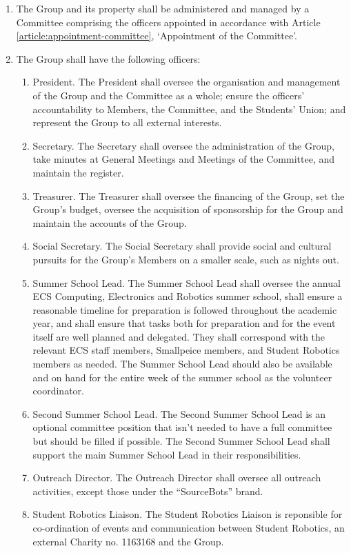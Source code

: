 \documentclass[12pt]{constitution}
\begin{document}
\begin{enumerate}
    \item The Group and its property shall be administered and managed by a Committee comprising the officers appointed in accordance with Article \ref{article:appointment-committee}, `Appointment of the Committee'.
    \item The Group shall have the following officers:
    \begin{enumerate}
        \item President. The President shall oversee the organisation and management of the Group and the Committee as a whole; ensure the officers' accountability to Members, the Committee, and the Students' Union; and represent the Group to all external interests.
        \item Secretary. The Secretary shall oversee the administration of the Group, take minutes at General Meetings and Meetings of the Committee, and maintain the register.
        \item Treasurer. The Treasurer shall oversee the financing of the Group, set the Group's budget, oversee the acquisition of sponsorship for the Group and maintain the accounts of the Group.
        \item Social Secretary. The Social Secretary shall provide social and cultural pursuits for the Group’s Members on a smaller scale, such as nights out.
        \item Summer School Lead. The Summer School Lead shall oversee the annual ECS Computing, Electronics and Robotics summer school, shall ensure a reasonable timeline for preparation is followed throughout the academic year, and shall ensure that tasks both for preparation and for the event itself are well planned and delegated. They shall correspond with the relevant ECS staff members, Smallpeice members, and Student Robotics members as needed. The Summer School Lead should also be available and on hand for the entire week of the summer school as the volunteer coordinator.
        \item Second Summer School Lead. The Second Summer School Lead is an optional committee position that isn’t needed to have a full committee but should be filled if possible. The Second Summer School Lead shall support the main Summer School Lead in their responsibilities.
        \item Outreach Director. The Outreach Director shall oversee all outreach activities, except those under the ``SourceBots'' brand.
        \item Student Robotics Liaison. The Student Robotics Liaison is reponsible for co-ordination of events and communication between Student Robotics, an external Charity no. 1163168 and the Group.
    \end{enumerate}


\end{enumerate}
\end{document}
